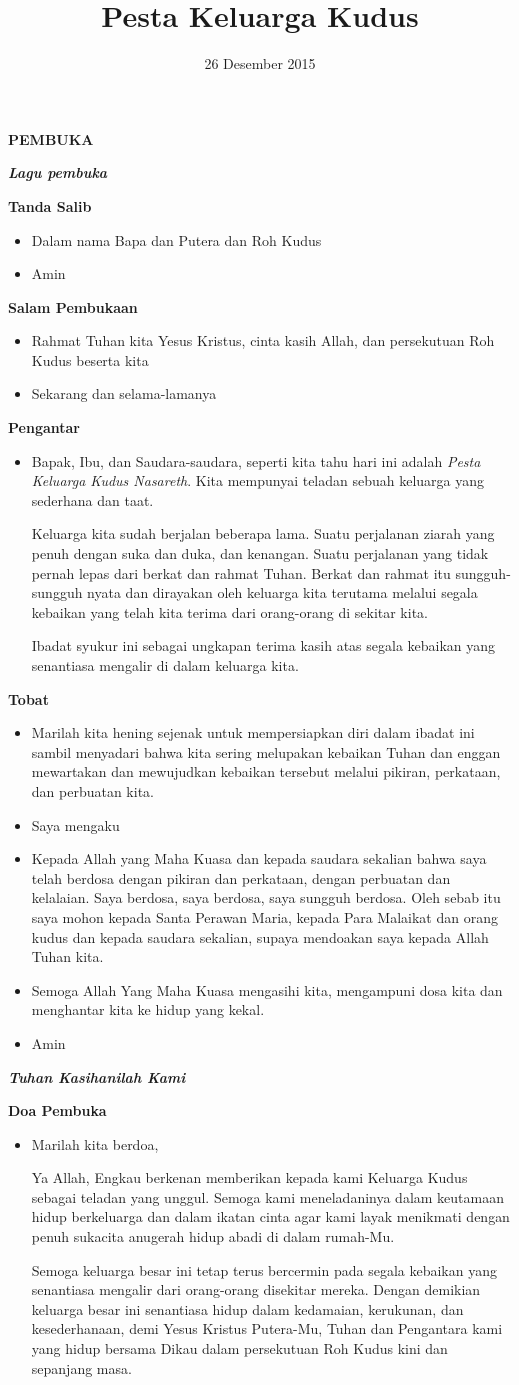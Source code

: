 \documentclass[a5paper,12pt,openany]{scrbook}
\title{Pesta Keluarga Kudus}
\date{26 Desember 2015}
\makeatletter
\newcommand{\judul}[1]{%
  {\parindent \z@ \centering \normalfont
    \interlinepenalty\@M \Large \bfseries #1\par\nobreak \vskip 20\p@ }}
\newcommand{\subjudul}[1]{%
  {\parindent \z@ \normalfont
    \interlinepenalty\@M \bfseries #1\par\nobreak \vskip 20\p@ }}
\newcommand{\lagu}[1]{%
  {\parindent \z@ \normalfont
    \interlinepenalty\@M \bfseries \emph{#1}\par\nobreak \vskip 20\p@ }}
\newcommand{\BU}[1]{\begin{itemize} \item[U:] #1 \end{itemize}}
\newcommand{\BI}[1]{\begin{itemize} \item[P:] #1 \end{itemize}}
\makeatother
\begin{document}
\maketitle
\judul{PEMBUKA}

\lagu{Lagu pembuka}

\subjudul{Tanda Salib}
\BI{Dalam nama Bapa dan Putera dan Roh Kudus}
\BU{Amin}

\subjudul{Salam Pembukaan}
\BI{Rahmat Tuhan kita Yesus Kristus, cinta kasih Allah, dan persekutuan Roh Kudus beserta kita}
\BU{Sekarang dan selama-lamanya}

\subjudul{Pengantar}
\BI{Bapak, Ibu, dan Saudara-saudara, seperti kita tahu hari ini adalah \textit{Pesta Keluarga Kudus Nasareth}. Kita mempunyai teladan sebuah keluarga yang sederhana dan taat.

Keluarga kita sudah berjalan beberapa lama. Suatu perjalanan ziarah yang penuh dengan suka dan duka, dan kenangan. Suatu perjalanan yang tidak pernah lepas dari berkat dan rahmat Tuhan. Berkat dan rahmat itu sungguh-sungguh nyata dan dirayakan oleh keluarga kita terutama melalui segala kebaikan yang telah kita terima dari orang-orang di sekitar kita.

Ibadat syukur ini sebagai ungkapan terima kasih atas segala kebaikan yang senantiasa mengalir di dalam keluarga kita.}

\subjudul{Tobat}
\BI{Marilah kita hening sejenak untuk mempersiapkan diri dalam ibadat ini sambil menyadari bahwa kita sering melupakan kebaikan Tuhan dan enggan mewartakan dan mewujudkan kebaikan tersebut melalui pikiran, perkataan, dan perbuatan kita.}

\BI{Saya mengaku}

\BU{Kepada Allah yang Maha Kuasa dan kepada saudara sekalian bahwa saya telah berdosa dengan pikiran dan perkataan, dengan perbuatan dan kelalaian. Saya berdosa, saya berdosa, saya sungguh berdosa. Oleh sebab itu saya mohon kepada Santa Perawan Maria, kepada Para Malaikat dan orang kudus dan kepada saudara sekalian, supaya mendoakan saya kepada Allah Tuhan kita.}

\BI{Semoga Allah Yang Maha Kuasa mengasihi kita, mengampuni dosa kita dan menghantar kita ke hidup yang kekal.}

\BU{Amin}

\lagu{Tuhan Kasihanilah Kami}

\subjudul{Doa Pembuka}

\BI{Marilah kita berdoa,

Ya Allah, Engkau berkenan memberikan kepada kami Keluarga Kudus sebagai teladan yang unggul. Semoga kami meneladaninya dalam keutamaan hidup berkeluarga dan dalam ikatan cinta agar kami layak menikmati dengan penuh sukacita anugerah hidup abadi di dalam rumah-Mu.

Semoga keluarga besar ini tetap terus bercermin pada segala kebaikan yang senantiasa mengalir dari orang-orang disekitar mereka. Dengan demikian keluarga besar ini senantiasa hidup dalam kedamaian, kerukunan, dan kesederhanaan, demi Yesus Kristus Putera-Mu, Tuhan dan Pengantara kami yang hidup bersama Dikau dalam persekutuan Roh Kudus kini dan sepanjang masa.}
\end{document}
